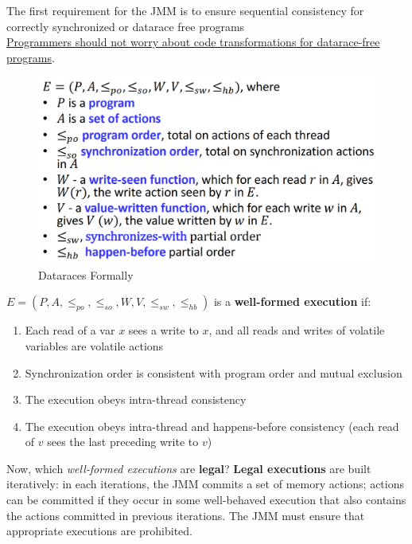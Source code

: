 The first requirement for the JMM is to ensure sequential consistency for correctly synchronized or datarace free programs\\
\ul{Programmers should not worry about code transformations for datarace-free programs}.

\begin{figure}[htbp]
   \centering
   \includegraphics{images/jmm_dataraces.png}
   \caption{Dataraces Formally}
   \label{fig:jmm_dataraces}
\end{figure}



$E = (P,A,\leq_{po},\leq_{so},W,V,\leq_{sw},\leq_{hb})$ is a \textbf{well-formed execution} if:
\begin{enumerate}
   \item Each read of a var $x$ sees a write to $x$, and all reads and writes of volatile variables are volatile actions
   \item Synchronization order is consistent with program order and mutual exclusion
   \item The execution obeys intra-thread consistency
   \item The execution obeys intra-thread and happens-before consistency (each read of $v$ sees the last preceding write to $v$)
\end{enumerate}

Now, which \textit{well-formed executions} are \textbf{legal}?
\textbf{Legal executions} are built iteratively:
in each iterations, the JMM commits a set of memory actions;
actions can be committed if they occur in some well-behaved execution that also contains the actions
committed in previous iterations.
The JMM must ensure that appropriate executions are prohibited.

